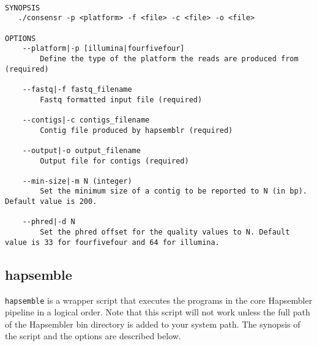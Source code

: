 \documentclass[12pt,a4paper]{report}
\begin{document}
\begin{lstlisting}

SYNOPSIS
   ./consensr -p <platform> -f <file> -c <file> -o <file> 

OPTIONS 
    --platform|-p [illumina|fourfivefour] 
        Define the type of the platform the reads are produced from (required) 

    --fastq|-f fastq_filename 
        Fastq formatted input file (required) 

    --contigs|-c contigs_filename 
        Contig file produced by hapsemblr (required) 

    --output|-o output_filename 
        Output file for contigs (required) 

    --min-size|-m N (integer) 
        Set the minimum size of a contig to be reported to N (in bp). Default value is 200. 

    --phred|-d N 
        Set the phred offset for the quality values to N. Default value is 33 for fourfivefour and 64 for illumina. 

\end{lstlisting}

\subsection{hapsemble}

\texttt{hapsemble} is a wrapper script that executes the programs in the core Hapsembler pipeline in a logical order. Note that this script will not work unless the full path of the Hapsembler bin directory is added to your system path. The synopsis of the script and the options are described below.
\end{document}

